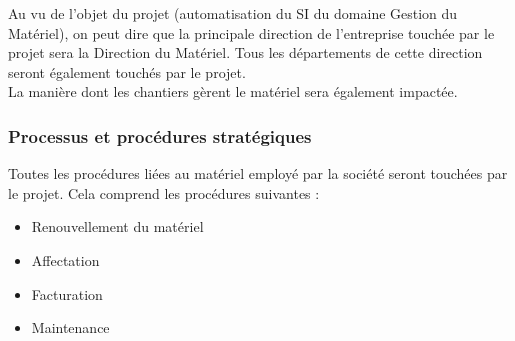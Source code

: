 \documentclass[12pt]{article}
\begin{document}
Au vu de l'objet du projet (automatisation du SI du domaine Gestion du
Matériel), on peut dire que la principale direction de l'entreprise touchée
par le projet sera la Direction du Matériel. Tous les départements de cette
direction seront également touchés par le projet.\\
La manière dont les chantiers gèrent le matériel sera également impactée.


\subsubsection{Processus et procédures stratégiques}

Toutes les procédures liées au matériel employé par la société seront
touchées par le projet. Cela comprend les procédures suivantes :
\begin{itemize}
\item Renouvellement du matériel
\item Affectation
\item Facturation
\item Maintenance
\end{itemize}
\end{document}
